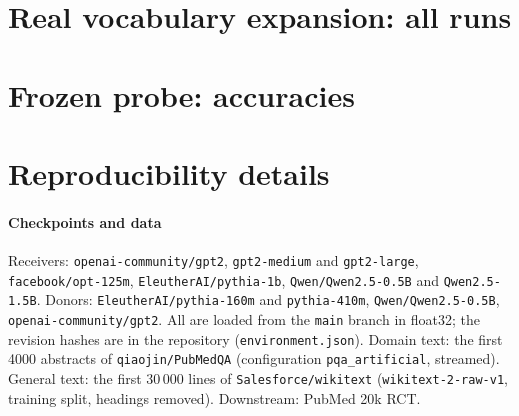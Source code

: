 \documentclass[preprint,12pt]{elsarticle}
\begin{document}
\appendix
\section{Real vocabulary expansion: all runs}
\label{app:rv}
\begin{table}[H]
\centering\scriptsize
\caption{Ridge minus each method, NLL per sentence in nats, for each of the 16 runs (negative = ridge better; $^{*}$ 95\,\% interval excludes 0). ``vs.\ unch.'' = ridge minus the unchanged receiver; OMP-64c = official OMP-64 on centred inputs; OMP-64s = as shipped; OMP-32 = our scikit-learn implementation.}
\label{tab:rvfull}
\resizebox{\textwidth}{!}{}
\end{table}

\section{Frozen probe: accuracies}
\label{app:probe}
\begin{table}[H]
\centering\small
\caption{Frozen-probe accuracy (logistic regression on frozen features; emb = embedding layer, mid = middle layer, last = last layer). Majority-class accuracy 0.334.}
\label{tab:frozenacc}
\resizebox{\textwidth}{!}{}
\end{table}

\section{Reproducibility details}
\label{app:repro}
\paragraph{Checkpoints and data}\sloppy Receivers: \texttt{openai-community/gpt2}, \texttt{gpt2-medium} and \texttt{gpt2-large}, \texttt{facebook/opt-125m}, \texttt{EleutherAI/pythia-1b}, \texttt{Qwen/Qwen2.5-0.5B} and \texttt{Qwen2.5-1.5B}. Donors: \texttt{EleutherAI/pythia-160m} and \texttt{pythia-410m}, \texttt{Qwen/Qwen2.5-0.5B}, \texttt{openai-community/gpt2}. All are loaded from the \texttt{main} branch in float32; the revision hashes are in the repository (\texttt{environment.json}). Domain text: the first 4000 abstracts of \texttt{qiaojin/PubMedQA} (configuration \texttt{pqa\_artificial}, streamed). General text: the first 30\,000 lines of \texttt{Salesforce/wikitext} (\texttt{wikitext-2-raw-v1}, training split, headings removed). Downstream: PubMed 20k RCT.
\end{document}
